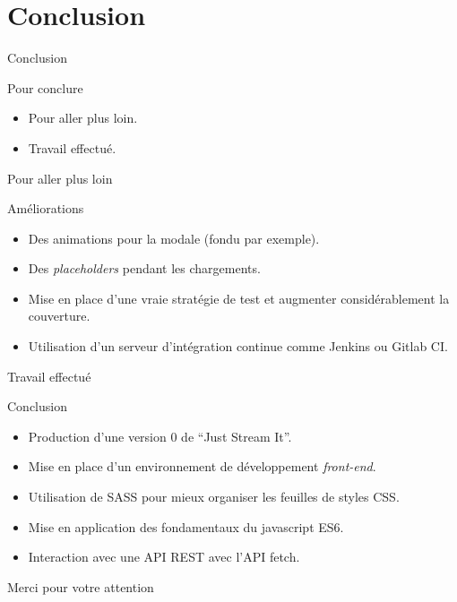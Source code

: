 \section{Conclusion}

\begin{frame}{Conclusion}
  \begin{block}{Pour conclure}
    \begin{itemize}
    \item Pour aller plus loin.
    \item Travail effectué.
    \end{itemize}
  \end{block}
\end{frame}

\begin{frame}{Pour aller plus loin}
  \begin{block}{Améliorations}
    \begin{itemize}
    \item Des animations pour la modale (fondu par exemple).
    \item Des \textit{placeholders} pendant les chargements.
    \item Mise en place d'une vraie stratégie de test et augmenter
      considérablement la couverture.
    \item Utilisation d'un serveur d'intégration continue comme
      Jenkins ou Gitlab CI.
    \end{itemize}
  \end{block}
\end{frame}

\begin{frame}{Travail effectué}  
  \begin{block}{Conclusion}
    \begin{itemize}
    \item Production d'une version 0 de ``Just Stream It''.
    \item Mise en place d'un environnement de développement \textit{front-end}.
    \item Utilisation de SASS pour mieux organiser les feuilles de styles CSS.
    \item Mise en application des fondamentaux du javascript ES6.
    \item Interaction avec une API REST avec l'API fetch.      
    \end{itemize}
  \end{block}  
\end{frame}

\begin{frame}{Merci pour votre attention}
  \tableofcontents
\end{frame}
